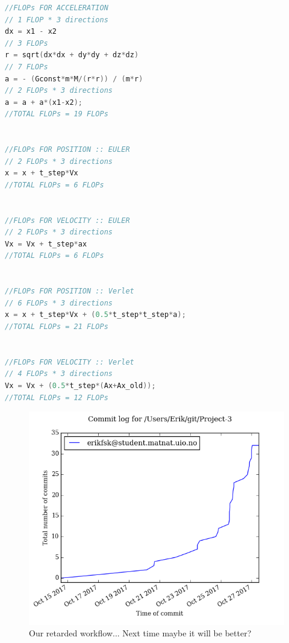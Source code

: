\begin{lstlisting}[language=c++]
//FLOPs FOR ACCELERATION
// 1 FLOP * 3 directions
dx = x1 - x2
// 3 FLOPs
r = sqrt(dx*dx + dy*dy + dz*dz)
// 7 FLOPs
a = - (Gconst*m*M/(r*r)) / (m*r)
// 2 FLOPs * 3 directions
a = a + a*(x1-x2);																	
//TOTAL FLOPs = 19 FLOPs 


//FLOPs FOR POSITION :: EULER
// 2 FLOPs * 3 directions
x = x + t_step*Vx															
//TOTAL FLOPs = 6 FLOPs 


//FLOPs FOR VELOCITY :: EULER
// 2 FLOPs * 3 directions
Vx = Vx + t_step*ax															
//TOTAL FLOPs = 6 FLOPs 


//FLOPs FOR POSITION :: Verlet
// 6 FLOPs * 3 directions
x = x + t_step*Vx + (0.5*t_step*t_step*a);
//TOTAL FLOPs = 21 FLOPs


//FLOPs FOR VELOCITY :: Verlet
// 4 FLOPs * 3 directions
Vx = Vx + (0.5*t_step*(Ax+Ax_old));
//TOTAL FLOPs = 12 FLOPs
\end{lstlisting}

\pagebreak

\begin{figure}[H]
		\centering
		\includegraphics[width=0.7\linewidth]{appendix/bilder/workflow.png}
		\caption{Our retarded workflow... Next time maybe it will be better?}
		\label{fig:ab}
\end{figure}